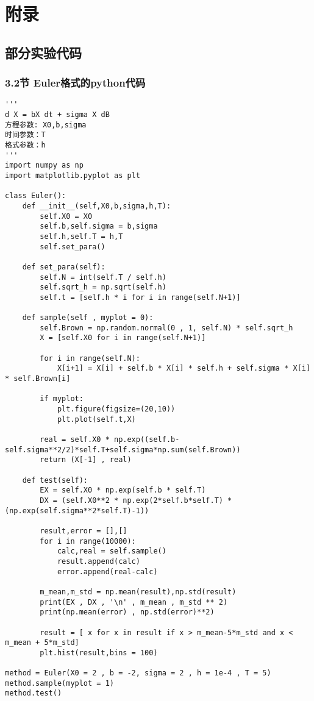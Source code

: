 \chapter{附录}
\section*{部分实验代码}
\subsection*{3.2节 Euler格式的python代码}

\scriptsize{
\begin{lstlisting}[style=styleP]
'''
d X = bX dt + sigma X dB
方程参数: X0,b,sigma
时间参数：T
格式参数：h
'''
import numpy as np
import matplotlib.pyplot as plt

class Euler():
	def __init__(self,X0,b,sigma,h,T):
		self.X0 = X0
		self.b,self.sigma = b,sigma
		self.h,self.T = h,T
		self.set_para()

	def set_para(self):
		self.N = int(self.T / self.h)
		self.sqrt_h = np.sqrt(self.h)
		self.t = [self.h * i for i in range(self.N+1)]
	
	def sample(self , myplot = 0):
		self.Brown = np.random.normal(0 , 1, self.N) * self.sqrt_h
		X = [self.X0 for i in range(self.N+1)]
		
		for i in range(self.N):
			X[i+1] = X[i] + self.b * X[i] * self.h + self.sigma * X[i] * self.Brown[i]
		
		if myplot:
			plt.figure(figsize=(20,10))
			plt.plot(self.t,X)
		
		real = self.X0 * np.exp((self.b-self.sigma**2/2)*self.T+self.sigma*np.sum(self.Brown))
		return (X[-1] , real)
	
	def test(self):
		EX = self.X0 * np.exp(self.b * self.T)
		DX = (self.X0**2 * np.exp(2*self.b*self.T) * (np.exp(self.sigma**2*self.T)-1))

		result,error = [],[]
		for i in range(10000):
			calc,real = self.sample()
			result.append(calc)
			error.append(real-calc)
		
		m_mean,m_std = np.mean(result),np.std(result) 
		print(EX , DX , '\n' , m_mean , m_std ** 2)
		print(np.mean(error) , np.std(error)**2)
		
		result = [ x for x in result if x > m_mean-5*m_std and x < m_mean + 5*m_std]
		plt.hist(result,bins = 100)

method = Euler(X0 = 2 , b = -2, sigma = 2 , h = 1e-4 , T = 5)
method.sample(myplot = 1)
method.test()
\end{lstlisting}
}



